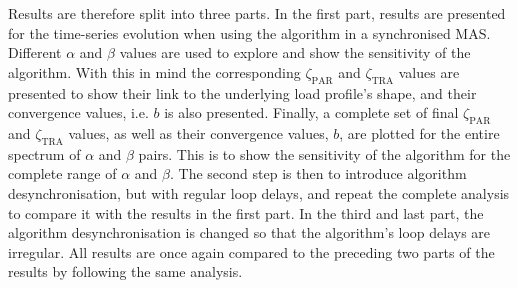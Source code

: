 Results are therefore split into three parts.
In the first part, results are presented for the time-series evolution when using the algorithm in a synchronised MAS.
Different $\alpha$ and $\beta$ values are used to explore and show the sensitivity of the algorithm.
With this in mind the corresponding $\zeta_\text{PAR}$ and $\zeta_\text{TRA}$ values are presented to show their link to the underlying load profile's shape, and their convergence values, i.e. $b$ is also presented.
Finally, a complete set of final $\zeta_\text{PAR}$ and $\zeta_\text{TRA}$ values, as well as their convergence values, $b$, are plotted for the entire spectrum of $\alpha$ and $\beta$ pairs.
This is to show the sensitivity of the algorithm for the complete range of $\alpha$ and $\beta$.
The second step is then to introduce algorithm desynchronisation, but with regular loop delays, and repeat the complete analysis to compare it with the results in the first part.
In the third and last part, the algorithm desynchronisation is changed so that the algorithm's loop delays are irregular.
All results are once again compared to the preceding two parts of the results by following the same analysis.



